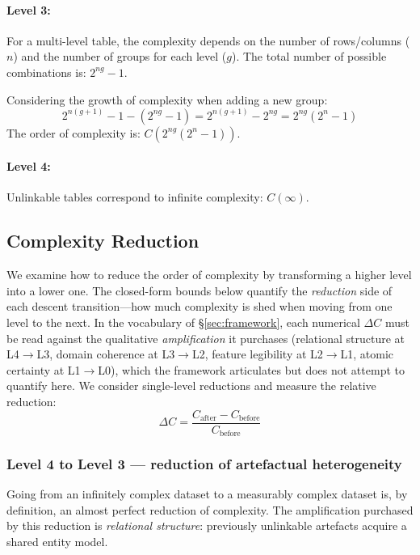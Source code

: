 \documentclass[12pt,a4paper]{article}
\begin{document}
\paragraph{Level 3:}
For a multi-level table, the complexity depends on the number of rows/columns ($n$) and the number of groups for each level ($g$). The total number of possible combinations is: $2^{ng} - 1$.

Considering the growth of complexity when adding a new group:
\begin{equation}
2^{n(g+1)} - 1 - (2^{ng} - 1) = 2^{n(g+1)} - 2^{ng} = 2^{ng} (2^n - 1)
\end{equation}
The order of complexity is: $C(2^{ng}(2^n - 1))$.

\paragraph{Level 4:}
Unlinkable tables correspond to infinite complexity: $C(\infty)$.

\subsection{Complexity Reduction}

We examine how to reduce the order of complexity by transforming a higher level into a lower one. The closed-form bounds below quantify the \emph{reduction} side of each descent transition---how much complexity is shed when moving from one level to the next. In the vocabulary of \S\ref{sec:framework}, each numerical $\Delta C$ must be read against the qualitative \emph{amplification} it purchases (relational structure at L4$\to$L3, domain coherence at L3$\to$L2, feature legibility at L2$\to$L1, atomic certainty at L1$\to$L0), which the framework articulates but does not attempt to quantify here. We consider single-level reductions and measure the relative reduction:
\begin{equation}
\Delta C = \frac{C_{\text{after}} - C_{\text{before}}}{C_{\text{before}}}
\end{equation}

\subsubsection{Level 4 to Level 3 — reduction of artefactual heterogeneity}
Going from an infinitely complex dataset to a measurably complex dataset is, by definition, an almost perfect reduction of complexity. The amplification purchased by this reduction is \emph{relational structure}: previously unlinkable artefacts acquire a shared entity model.
\end{document}
